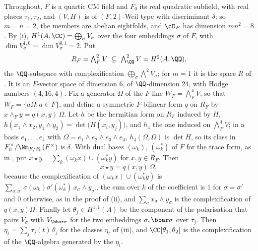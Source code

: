 Throughout, $F$ is a quartic CM field and $F_{0}$ its real quadratic subfield,
with real places $\tau_{1},\tau_{2}$, and $(V,H)$ is of $(F,2)$-Weil type with
discriminant $\delta$; so $m=n=2$, the members are abelian eightfolds, and
$\cD_{F}$ has dimension $mn^{2}=8$. By (i),
$H^{1}(A,\CC)=\bigoplus_{\sigma}V_{\sigma}$ over the four embeddings $\sigma$ of
$F$, with $\dim V_{\sigma}^{1,0}=\dim V_{\sigma}^{0,1}=2$. Put
\[
  R_{F}=\textstyle\bigwedge^{2}_{F}V\;\subseteq\;\bigwedge^{2}_{\QQ}V=H^{2}(A,\QQ),
\]
the $\QQ$-subspace with complexification
$\bigoplus_{\sigma}\bigwedge^{2}V_{\sigma}$; for $m=1$ it is the space $R$ of
. It is an $F$-vector space of dimension $6$, of
$\QQ$-dimension $24$, with Hodge numbers $(4,16,4)$. Fix a generator $\Omega$
of the $F$-line $W_{F}=\bigwedge^{4}_{F}V$, so that
$W_{F}=\{a\Omega:a\in F\}$, and define a symmetric $F$-bilinear form $q$ on
$R_{F}$ by $x\wedge_{F}y=q(x,y)\,\Omega$. Let $h$ be the hermitian form on
$R_{F}$ induced by $H$, $h(x_{1}\wedge x_{2},y_{1}\wedge y_{2})
=\det\bigl(H(x_{i},y_{j})\bigr)$, and $h_{4}$ the one induced on
$\bigwedge^{4}_{F}V$; in a basis $e_{1},\dots,e_{4}$ with
$\Omega=e_{1}\wedge e_{2}\wedge e_{3}\wedge e_{4}$, $h_{4}(\Omega,\Omega)$ is
$\det H$, so its class in $F_{0}^{\times}/\Nm_{F/F_{0}}(F^{\times})$ is
$\delta$. With dual bases $(\omega_{k})$, $(\omega_{k}^{*})$ of $F$ for the
trace form, as in , put
$x\star y=\sum_{k}(\omega_{k}x)\cup(\omega_{k}^{*}y)$ for $x,y\in R_{F}$. Then
\begin{equation}\label{eq:quarticstar}
  x\star y=q(x,y)\,\Omega ,
\end{equation}
because the complexification of $(\omega_{k}x)\cup(\omega_{k}^{*}y)$ is
$\sum_{\sigma,\sigma'}\sigma(\omega_{k})\sigma'(\omega_{k}^{*})\,
x_{\sigma}\wedge y_{\sigma'}$, the sum over $k$ of the coefficient is $1$ for
$\sigma=\sigma'$ and $0$ otherwise, as in the proof of
(ii), and $\sum_{\sigma}x_{\sigma}\wedge y_{\sigma}$ is
the complexification of $q(x,y)\Omega$. Finally let $\theta_{j}\in H^{1,1}(A)$
be the component of the polarisation that pairs $V_{\sigma}$ with
$V_{\bbar\sigma}$ for the two embeddings $\sigma,\bbar\sigma$ over $\tau_{j}$.
Then $\eta_{t}=\sum_{j}\tau_{j}(t)\,\theta_{j}$ for the classes $\eta_{t}$ of
(iii), and $\CC[\theta_{1},\theta_{2}]$ is the
complexification of the $\QQ$-algebra generated by the $\eta_{t}$.


